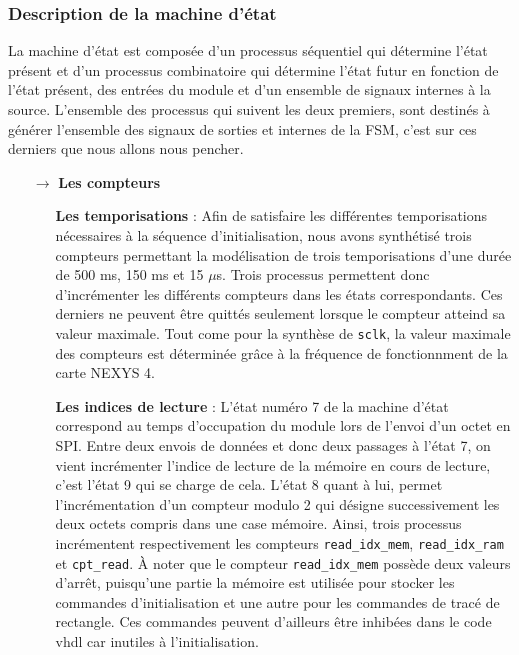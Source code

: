 \documentclass[11pt]{article}
\begin{document}
\subsubsection{Description de la machine d'état}

La machine d'état est composée d'un processus séquentiel qui détermine l'état présent et d'un processus combinatoire qui détermine l'état futur en fonction de l'état présent, des entrées du module et d'un ensemble de signaux internes à la source. L'ensemble des processus qui suivent les deux premiers, sont destinés à générer l'ensemble des signaux de sorties et internes de la FSM, c'est sur ces derniers que nous allons nous pencher.

\begin{itemize}

\item[$\rightarrow$] \textbf{Les compteurs}

\begin{itemize}

\item[\textbullet] \textbf{Les temporisations} : Afin de satisfaire les différentes temporisations nécessaires à la séquence d'initialisation, nous avons synthétisé trois compteurs permettant la modélisation de trois temporisations d'une durée de 500 ms, 150 ms et 15 $\mu$s. Trois processus permettent donc d'incrémenter les différents compteurs dans les états correspondants. Ces derniers ne peuvent être quittés seulement lorsque le compteur atteind sa valeur maximale. Tout come pour la synthèse de \texttt{sclk}, la valeur maximale des compteurs est déterminée grâce à la fréquence de fonctionnment de la carte NEXYS 4.

\item[\textbullet] \textbf{Les indices de lecture} : L'état numéro 7 de la machine d'état correspond au temps d'occupation du module lors de l'envoi d'un octet en SPI. Entre deux envois de données et donc deux passages à l'état 7, on vient incrémenter l'indice de lecture de la mémoire en cours de lecture, c'est l'état 9 qui se charge de cela. L'état 8 quant à lui, permet l'incrémentation d'un compteur modulo 2 qui désigne successivement les deux octets compris dans une case mémoire. Ainsi, trois processus incrémentent respectivement les compteurs \texttt{read\_idx\_mem}, \texttt{read\_idx\_ram} et \texttt{cpt\_read}. À noter que le compteur \texttt{read\_idx\_mem} possède deux valeurs d'arrêt, puisqu'une partie la mémoire est utilisée pour stocker les commandes d'initialisation et une autre pour les commandes de tracé de rectangle. Ces commandes peuvent d'ailleurs être inhibées dans le code vhdl car inutiles à l'initialisation.


\end{itemize}
\end{itemize}
\end{document}
